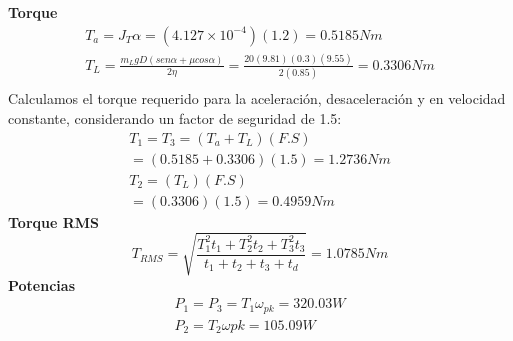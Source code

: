 \textbf{Torque}
\begin{align}
    T_a = J_{T}\alpha=(4.127\times 10^{-4})(1.2)=0.5185Nm \\
    T_L = \frac{m_LgD(sen\alpha+\mu cos\alpha)}{2 \eta}=\frac{20(9.81)(0.3)(9.55)}{2(0.85)}=0.3306Nm \\
\end{align}
Calculamos el torque requerido para la aceleración, desaceleración y en velocidad constante, considerando un factor de seguridad de 1.5:
\begin{align}
    T_1 = T_3 = (T_a+T_L)(F.S)\\
    = (0.5185+0.3306)(1.5) = 1.2736Nm \\
    T_2 = (T_L)(F.S) \\
    = (0.3306)(1.5)=0.4959Nm
\end{align}
\textbf{Torque RMS}
\begin{equation}
    T_{RMS}=\sqrt{\frac{T_1^2t_1+T_2^2t_2+T_3^2t_3}{t_1+t_2+t_3+t_d}} = 1.0785Nm
\end{equation}
\textbf{Potencias}
\begin{align}
    P_1 = P_3 = T_1\omega_{pk} = 320.03W \\
    P_2 = T_2\omega{pk}=105.09W
\end{align}